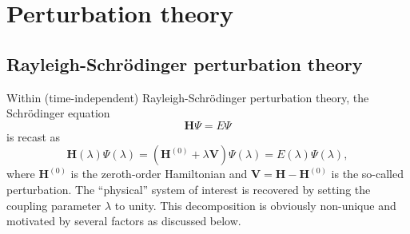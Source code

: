 \documentclass[11pt,a4paper]{article}
\newcommand{\bH}{\mathbf{H}}
\newcommand{\bV}{\mathbf{V}}
\begin{document}
\section{Perturbation theory}

\subsection{Rayleigh-Schr\"odinger perturbation theory}

Within (time-independent) Rayleigh-Schr\"odinger perturbation theory, the Schr\"odinger equation 
\begin{equation} \label{eq:SchrEq}
	\bH \Psi = E \Psi
\end{equation} 
is recast as 
\begin{equation} \label{eq:SchrEq-PT}
	\bH(\lambda) \Psi(\lambda) = (\bH^{(0)} + \lambda \bV ) \Psi(\lambda) = E(\lambda) \Psi(\lambda),
\end{equation}
where $\bH^{(0)}$ is the zeroth-order Hamiltonian and $\bV = \bH - \bH^{(0)}$ is the so-called perturbation.
The ``physical'' system of interest is recovered by setting the coupling parameter $\lambda$ to unity.
This decomposition is obviously non-unique and motivated by several factors as discussed below.
\end{document}
